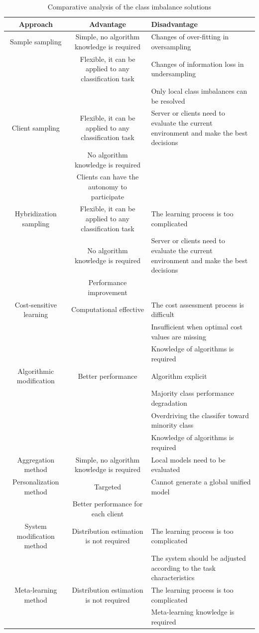 \documentclass[10pt,journal,compsoc]{IEEEtran}
\begin{document}
	\begin{table}[!t]
		\centering
		\caption{Comparative analysis of the class imbalance solutions}	     
		\label{analysis}  		       	
		\begin{tabular}{cc p{6cm}}
			\hline
			Approach& Advantage&Disadvantage \\ 
			\hline
			Sample sampling&Simple, no algorithm knowledge is required&Changes of over-fitting in oversampling\\
			&Flexible, it can be applied to any classification task&Changes of information loss in undersampling\\ 
			&&Only local class imbalances can be resolved\\ \hline
			Client sampling&Flexible, it can be applied to any classification task&Server or clients need to evaluate the current environment and make the best decisions\\
			&No algorithm knowledge is required&\\ 
			&Clients can have the autonomy to participate& \\ \hline
			Hybridization sampling&Flexible, it can be applied to any classification task&The learning process is too complicated\\
			&No algorithm knowledge is required&Server or clients need to evaluate the current environment and make the best decisions\\ 
			&Performance improvement&\\
			\hline
			Cost-sensitive learning&Computational effective &The cost assessment process is difficult\\
			&&Insufficient when optimal cost values are missing\\ 
			&&Knowledge of algorithms is required\\
			\hline
			Algorithmic modification&Better performance&Algorithm explicit\\ 
			&&Majority class performance degradation\\ 
			&&Overdriving the classifer toward minority	class\\ 
			&&Knowledge of algorithms is required\\ \hline
			Aggregation method&Simple, no algorithm knowledge is required&Local models need to be evaluated\\ \hline
			Personalization method&Targeted&Cannot generate a global unified model\\
			&Better performance for each client &                             \\ \hline
			System modification method&Distribution estimation is not required&The learning process is too complicated\\
			&&The system should be adjusted according to the task characteristics\\ \hline
			Meta-learning method&Distribution estimation is not required&The learning process is too complicated\\ 
			&&Meta-learning knowledge is required\\
			\hline
		\end{tabular}
	\end{table}
	
\end{document}
